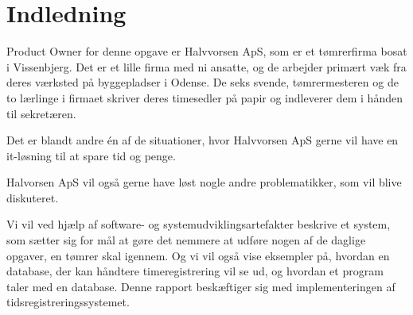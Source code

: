 \section{Indledning}
Product Owner for denne opgave er Halvvorsen ApS, som er et tømrerfirma bosat i Vissenbjerg.
Det er et lille firma med ni ansatte, og de arbejder primært væk fra deres værksted på byggepladser i Odense.
De seks svende, tømrermesteren og de to lærlinge i firmaet skriver deres timesedler på papir og indleverer dem i hånden til sekretæren. 

Det er blandt andre én af de situationer, hvor Halvvorsen ApS gerne vil have en it-løsning til at spare tid og penge.

Halvorsen ApS vil også gerne have løst nogle andre problematikker, som vil blive diskuteret.

Vi vil ved hjælp af software- og systemudviklingsartefakter beskrive et system, som sætter sig for mål at gøre det nemmere at udføre nogen af de daglige opgaver, en tømrer skal igennem. Og vi vil også vise eksempler på, hvordan en database, der kan håndtere timeregistrering vil se ud, og hvordan et program taler med en database.
Denne rapport beskæftiger sig med implementeringen af tidsregistreringssystemet.